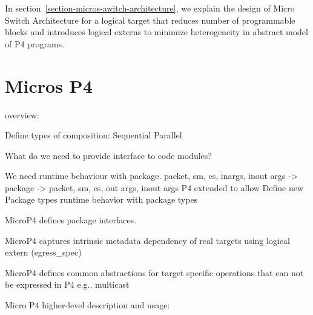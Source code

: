 \documentclass[10pt,sigconf,letterpaper,anonymous]{acmart}
\begin{document}
In section~\ref{section-micros-awitch-architecture}, we explain the design of Micro Switch Architecture for a logical target that reduces number of programmable blocks and introduces logical externs to minimize heterogeneity in abstract model of P4 programs.





\section{Micros P4}

overview:


Define types of composition: 
Sequential
Parallel


What do we need to provide interface to code modules?

We need runtime behaviour with package. 
packet, sm, es, inargs, inout args -> package -> packet, sm, es, out args, inout args
P4 extended to 
allow Define new Package types
runtime behavior with package types

MicroP4 defines package interfaces.


MicroP4 captures intrinsic metadata dependency of real targets using logical extern (egress\_spec)

MicroP4 defines common abstractions for target specific operations that can not be expressed in P4
e.g., multicast



Micro P4 higher-level description and usage:

\end{document}

